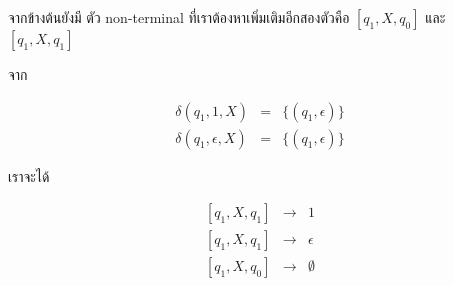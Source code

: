 \par{
จากข้างต้นยังมี ตัว non-terminal ที่เราต้องหาเพิ่มเติมอีกสองตัวคือ $[q_1, X, q_0]$ และ $[q_1, X, q_1]$
}

\par{
จาก

\begin{eqnarray*}
\delta(q_1, 1, X) & = & \{(q_1, \epsilon)\} \\
\delta(q_1, \epsilon, X) & = & \{(q_1, \epsilon)\}
\end{eqnarray*}

เราจะได้

\begin{eqnarray*}
\left[q_1, X, q_1\right] & \rightarrow & 1 \\
\left[q_1, X, q_1\right] & \rightarrow & \epsilon \\
\left[q_1, X, q_0\right] & \rightarrow & \emptyset \\
\end{eqnarray*}
}

